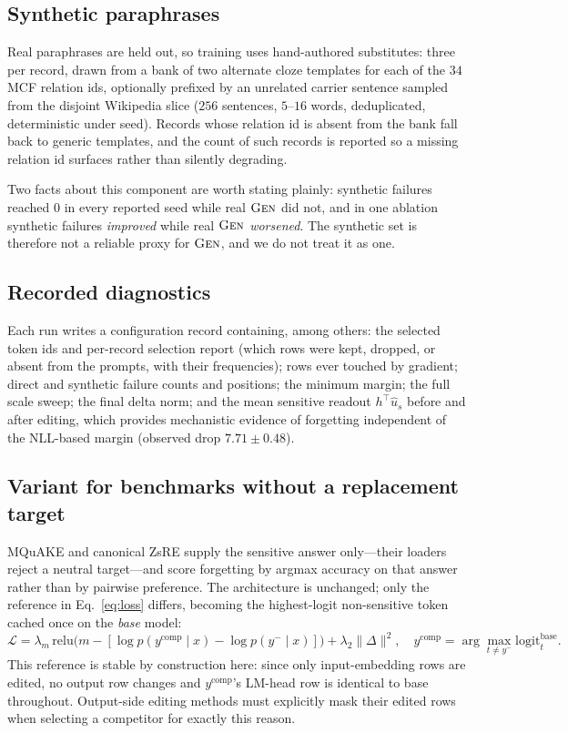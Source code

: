 \documentclass[11pt]{article}
\newcommand{\Gen}{\textsc{Gen}}
\begin{document}
\subsection{Synthetic paraphrases}

Real paraphrases are held out, so training uses hand-authored substitutes:
three per record, drawn from a bank of two alternate cloze templates for each
of the $34$ MCF relation ids, optionally prefixed by an unrelated carrier
sentence sampled from the disjoint Wikipedia slice ($256$ sentences, $5$--$16$
words, deduplicated, deterministic under seed). Records whose relation id is
absent from the bank fall back to generic templates, and the count of such
records is reported so a missing relation id surfaces rather than silently
degrading.

Two facts about this component are worth stating plainly: synthetic failures
reached $0$ in every reported seed while real $\Gen$ did not, and in one
ablation synthetic failures \emph{improved} while real $\Gen$ \emph{worsened}.
The synthetic set is therefore not a reliable proxy for $\Gen$, and we do not
treat it as one.

\subsection{Recorded diagnostics}

Each run writes a configuration record containing, among others: the selected
token ids and per-record selection report (which rows were kept, dropped, or
absent from the prompts, with their frequencies); rows ever touched by
gradient; direct and synthetic failure counts and positions; the minimum
margin; the full scale sweep; the final delta norm; and the mean sensitive
readout $h^\top \hat u_s$ before and after editing, which provides mechanistic
evidence of forgetting independent of the NLL-based margin (observed drop
$7.71 \pm 0.48$).

\subsection{Variant for benchmarks without a replacement target}

MQuAKE and canonical ZsRE supply the sensitive answer only---their loaders
reject a neutral target---and score forgetting by argmax accuracy on that
answer rather than by pairwise preference. The architecture is unchanged; only
the reference in Eq.~\eqref{eq:loss} differs, becoming the highest-logit
non-sensitive token cached once on the \emph{base} model:
\begin{equation}
\mathcal{L} = \lambda_m\,
\mathrm{relu}\!\big(m - [\log p(y^{\text{comp}}\mid x) - \log p(y^{-}\mid x)]\big)
+ \lambda_2 \lVert\Delta\rVert^2 ,
\quad
y^{\text{comp}} = \arg\max_{t \neq y^{-}} \mathrm{logit}_t^{\text{base}} .
\end{equation}
This reference is stable by construction here: since only input-embedding rows
are edited, no output row changes and $y^{\text{comp}}$'s LM-head row is
identical to base throughout. Output-side editing methods must explicitly mask
their edited rows when selecting a competitor for exactly this reason.
\end{document}
